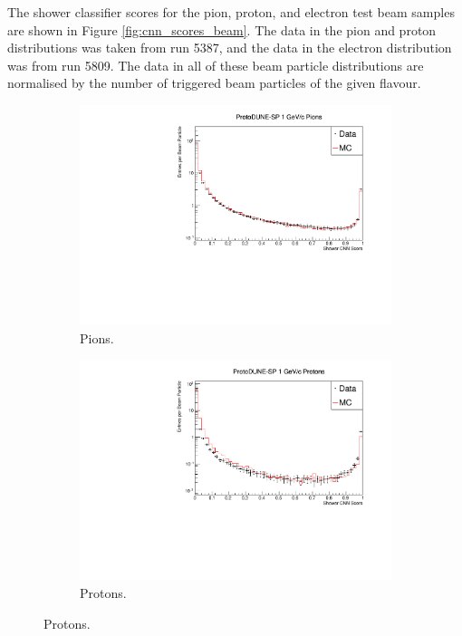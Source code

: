 The shower classifier scores for the pion, proton, and electron test beam 
samples are shown in Figure \ref{fig:cnn_scores_beam}. The data in the pion 
and proton distributions was taken from \protodune{} run 5387, and the data in 
the electron distribution was from run 5809. The data in all of these beam
particle distributions are normalised by the number of triggered 
beam particles of the given flavour.
\begin{figure}

	\centering

	\begin{subfigure}[b]{0.68\textwidth}
		\centering
		\includegraphics[width=\textwidth]{figures/hit_cnn_pion.pdf}
		\caption {Pions.}
		\label{fig:beam_pi_cnn}
	\end{subfigure}

	\begin{subfigure}[b]{0.68\textwidth}
		\centering
		\includegraphics[width=\textwidth]{figures/hit_cnn_proton.pdf}
		\caption {Protons.}
		\label{fig:beam_proton_cnn}
	\end{subfigure}


\end{figure}
